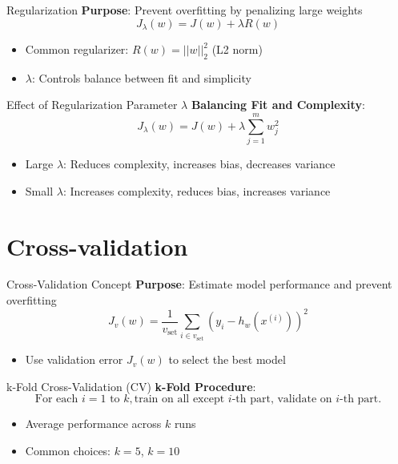 \documentclass[serif, aspectratio=169]{beamer}
\begin{document}
\begin{frame}{Regularization}
    \textbf{Purpose}: Prevent overfitting by penalizing large weights
    \[
    J_{\lambda}(w) = J(w) + \lambda R(w)
    \]
    \begin{itemize}
        \item Common regularizer: \( R(w) = ||w||_2^2 \) (L2 norm)
        \item \( \lambda \): Controls balance between fit and simplicity
    \end{itemize}
\end{frame}

\begin{frame}{Effect of Regularization Parameter \( \lambda \)}
    \textbf{Balancing Fit and Complexity}:
    \[
    J_{\lambda}(w) = J(w) + \lambda \sum_{j=1}^{m} w_j^2
    \]
    \begin{itemize}
        \item Large \( \lambda \): Reduces complexity, increases bias, decreases variance
        \item Small \( \lambda \): Increases complexity, reduces bias, increases variance
    \end{itemize}
\end{frame}

\section{Cross-validation}
\begin{frame}{Cross-Validation Concept}
    \textbf{Purpose}: Estimate model performance and prevent overfitting
    \[
    J_v(w) = \frac{1}{v_{\text{set}}} \sum_{i \in v_{\text{set}}} (y_i - h_w(x^{(i)}))^2
    \]
    \begin{itemize}
        \item Use validation error \( J_v(w) \) to select the best model
    \end{itemize}
\end{frame}

\begin{frame}{k-Fold Cross-Validation (CV)}
    \textbf{k-Fold Procedure}:
    \[
    \text{For each } i = 1 \text{ to } k, \text{train on all except } i\text{-th part, validate on } i\text{-th part.}
    \]
    \begin{itemize}
        \item Average performance across \( k \) runs
        \item Common choices: \( k = 5 \), \( k = 10 \)
    \end{itemize}
\end{frame}
\end{document}
